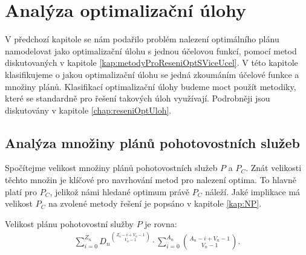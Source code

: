 \section{Analýza optimalizační úlohy}

V předchozí kapitole se nám podařilo problém nalezení optimálního plánu namodelovat jako optimalizační úlohu s jednou účelovou funkcí,
pomocí metod diskutovaných v kapitole \ref{kap:metodyProReseniOptSViceUcel}.
V této kapitole klasifikujeme o jakou optimalizační úlohu se jedná zkoumáním účelové funkce a množiny plánů.
Klasifikací optimalizační úlohy budeme moct použít metodiky, které se standardně pro řešení takových úloh využívají. 
Podrobněji jsou diskutovány v kapitole \ref{chap:reseniOptUloh}.

\subsection{Analýza množiny plánů pohotovostních služeb}\label{kap:analP}

Spočítejme velikost množiny plánů pohotovostních služeb $P$ a $P_C$.
Znát velikosti těchto množin je klíčové pro navrhování metod pro nalezení optima.
To hlavně platí pro $P_C$, jelikož námi hledané optimum právě $P_C$ náleží.
Jaké implikace má velikost $P_C$ na zvolené metody řešení je popsáno v kapitole \ref{kap:NP}.

\begin{veta}\label{veta:velikostP}
  Velikost plánu pohotovostní služby $P$ je rovna:
  \begin{align*}
    \sum_{i = 0}^{Z_n} {D_n}^{\binom{Z_n - i + V_n - 1}{V_n - 1}} \cdot \sum_{i = 0}^{A_n} {\binom{A_n - i + V_n - 1}{V_n - 1}}.
  \end{align*}
\end{veta}

